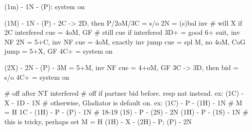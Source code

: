 (1m) - 1N - (P): system on

(1M) - 1N - (P) -
2C -> 2D, then
    P/2oM/3C = s/o
    2N = (s)bal inv  # will X if 2C interfered
    cue = 4oM, GF  # still cue if interfered
    3D+ = good 6+ suit, inv NF
2N = 5+C, inv NF
cue = 4oM, exactly inv
jump cue = spl M, no 4oM, CoG
jump = 5+X, GF
4C+ = system on

(2X) - 2N - (P) -
3M = 5+M, inv NF
cue = 4+oM, GF
3C -> 3D, then bid = s/o
4C+ = system on

# off after NT interfered
# off if partner bid before. resp nat instead. ex: (1C) - X - 1D - 1N
# otherwise, Gladiator is default on. ex:
(1C) - P - (1H) - 1N  # M = H
1C - (1H) - P - (P) - 1N  # 18-19
(1S) - P - (2S) - 2N
(1H) - P - (1S) - 1N  # this is tricky, perhaps set M = H
(1H) - X - (2H) - P; (P) - 2N